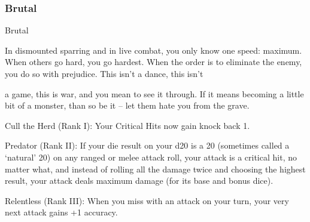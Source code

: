 \subsubsection{Brutal}

                                                      Brutal

In dismounted sparring and in live combat, you only know one speed: maximum. When others go hard, you
go hardest. When the order is to eliminate the enemy, you do so with prejudice. This isn’t a dance, this isn’t

a game, this is war, and you mean to see it through. If it means becoming a little bit of a monster, than so
be it -- let them hate you from the grave.




Cull the Herd (Rank I): Your Critical Hits now gain knock back 1.

Predator (Rank II): If your die result on your d20 is a 20 (sometimes called a `natural' 20) on any
ranged or melee attack roll, your attack is a critical hit, no matter what, and instead of rolling all
the damage twice and choosing the highest result, your attack deals maximum damage (for its
base and bonus dice).

Relentless (Rank III): When you miss with an attack on your turn, your very next attack gains +1
accuracy.